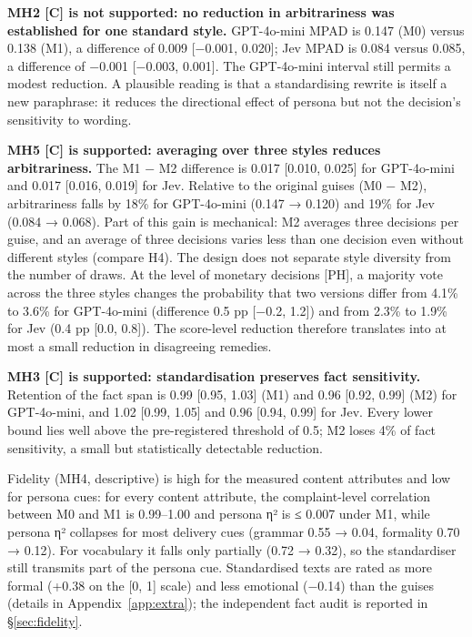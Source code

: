 \textbf{MH2 [C] is not supported: no reduction in arbitrariness was established for one standard style.} GPT-4o-mini MPAD is 0.147 (M0) versus 0.138 (M1), a difference of 0.009 [−0.001, 0.020]; Jev MPAD is 0.084 versus 0.085, a difference of −0.001 [−0.003, 0.001]. The GPT-4o-mini interval still permits a modest reduction. A plausible reading is that a standardising rewrite is itself a new paraphrase: it reduces the directional effect of persona but not the decision's sensitivity to wording.

\textbf{MH5 [C] is supported: averaging over three styles reduces arbitrariness.} The M1 − M2 difference is 0.017 [0.010, 0.025] for GPT-4o-mini and 0.017 [0.016, 0.019] for Jev. Relative to the original guises (M0 − M2), arbitrariness falls by 18\% for GPT-4o-mini (0.147 → 0.120) and 19\% for Jev (0.084 → 0.068). Part of this gain is mechanical: M2 averages three decisions per guise, and an average of three decisions varies less than one decision even without different styles (compare H4). The design does not separate style diversity from the number of draws. At the level of monetary decisions [PH], a majority vote across the three styles changes the probability that two versions differ from 4.1\% to 3.6\% for GPT-4o-mini (difference 0.5 pp [−0.2, 1.2]) and from 2.3\% to 1.9\% for Jev (0.4 pp [0.0, 0.8]). The score-level reduction therefore translates into at most a small reduction in disagreeing remedies.

\textbf{MH3 [C] is supported: standardisation preserves fact sensitivity.} Retention of the fact span is 0.99 [0.95, 1.03] (M1) and 0.96 [0.92, 0.99] (M2) for GPT-4o-mini, and 1.02 [0.99, 1.05] and 0.96 [0.94, 0.99] for Jev. Every lower bound lies well above the pre-registered threshold of 0.5; M2 loses 4\% of fact sensitivity, a small but statistically detectable reduction.


Fidelity (MH4, descriptive) is high for the measured content attributes and low for persona cues: for every content attribute, the complaint-level correlation between M0 and M1 is 0.99--1.00 and persona η² is ≤ 0.007 under M1, while persona η² collapses for most delivery cues (grammar 0.55 → 0.04, formality 0.70 → 0.12). For vocabulary it falls only partially (0.72 → 0.32), so the standardiser still transmits part of the persona cue. Standardised texts are rated as more formal (+0.38 on the [0, 1] scale) and less emotional (−0.14) than the guises (details in Appendix~\ref{app:extra}); the independent fact audit is reported in §\ref{sec:fidelity}.


